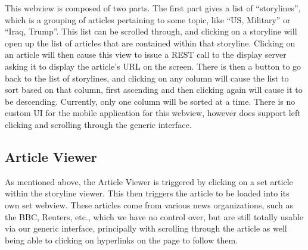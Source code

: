 This webview is composed of two parts. The first part gives a list
of ``storylines'', which is a grouping of articles pertaining to some
topic, like ``US, Military'' or ``Iraq, Trump''. This list can be
scrolled through, and clicking on a storyline will open up the list
of articles that are contained within that storyline. Clicking on an
article will then cause this view to issue a REST call to the display
server asking it to display the article's URL on the screen. There is
then a button to go back to the list of storylines, and clicking on
any column will cause the list to sort based on that column, first
ascending and then clicking again will cause it to be descending.
Currently, only one column will be sorted at a time. There is no
custom UI for the mobile application for this webview, however does
support left clicking and scrolling through the generic interface.

\subsection{Article Viewer}

As mentioned above, the Article Viewer is triggered by clicking on a
set article within the storyline viewer. This then triggers the
article to be loaded into its own set webview. These articles
come from various news organizations, such as the BBC, Reuters, etc.,
which we have no control over, but are still totally usable via our
generic interface, principally with scrolling through the article as well
being able to clicking on hyperlinks on the page to follow them.

